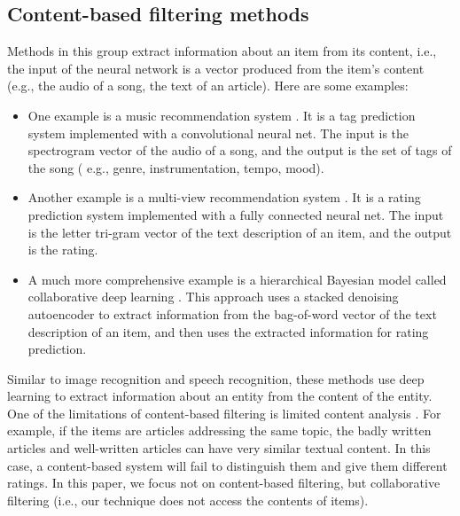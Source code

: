 \documentclass[sigconf]{acmart}
\begin{document}
\subsection{Content-based filtering methods}
Methods in this group extract information about an item from its content, 
i.e., the input of the neural network is a vector produced from the item's 
content (e.g., the audio of a song, the text of an article). Here are some 
examples:
\begin{itemize}
	\item One example is a music recommendation system 	\cite{van2013deep}. 
	It is a tag prediction system implemented with a convolutional neural net. 
	The input is the spectrogram vector of the audio of a song,
	and the output 	is the set of tags of the song (
	e.g., genre, instrumentation, tempo, mood).
	\item Another example is a multi-view recommendation system 	
	\cite{elkahky2015multi}. 
	It is a rating prediction system implemented with a fully connected 
	neural net.
	The input is the letter tri-gram vector of the text description of an item, 
	and the output is the rating.
	\item A much more comprehensive example is a hierarchical Bayesian model 
	called collaborative deep learning \cite{wang2015collaborative}.
	This approach uses a stacked denoising autoencoder to extract information 
	from the bag-of-word vector of the text description of an item,
	and then uses the extracted information for rating prediction.
\end{itemize}
Similar to image recognition and speech recognition, these methods use deep 
learning to extract information about an entity from the content of the entity.
One of the limitations of content-based filtering is limited content analysis 
\cite{adomavicius2005toward}.
For example, if the items are articles addressing the same topic,
the badly written articles and well-written articles can have very similar 
textual content. In this case, a content-based system will fail to distinguish 
them and give them different ratings.
In this paper, we focus not on content-based filtering, but collaborative 
filtering (i.e., our technique does not access the contents of items).
\end{document}
